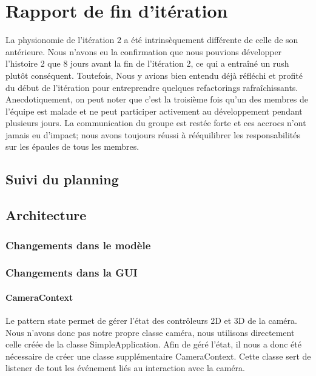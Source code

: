 \section{Rapport de fin d'itération}

La physionomie de l'itération 2 a été intrinsèquement différente de celle de son 
antérieure. Nous n'avons eu la confirmation que nous pouvions développer
l'histoire 2 que 8 jours avant la fin de l'itération 2, ce qui a entraîné un 
rush plutôt conséquent. Toutefois, Nous y avions bien entendu déjà réfléchi et 
profité du début de l'itération pour entreprendre quelques refactorings 
rafraîchissants.\\

Anecdotiquement, on peut noter que c'est la troisième fois qu'un des membres de
l'équipe est malade et ne peut participer activement au développement pendant
plusieurs jours. La communication du groupe est restée forte et ces accrocs 
n'ont jamais eu d'impact; nous avons toujours réussi à rééquilibrer les 
responsabilités sur les épaules de tous les membres.

\subsection{Suivi du planning}


\subsection{Architecture}
	
	\subsubsection{Changements dans le modèle}

	\subsubsection{Changements dans la GUI}

		\paragraph{CameraContext}
		Le pattern state permet de gérer l'état des contrôleurs 2D et 3D de la caméra. Nous n'avons donc pas notre propre classe caméra, nous utilisons directement celle créée de la classe SimpleApplication. Afin de géré l'état, il nous a donc été nécessaire de créer une classe supplémentaire CameraContext. Cette classe sert de listener de tout les événement liés au interaction avec la caméra.

